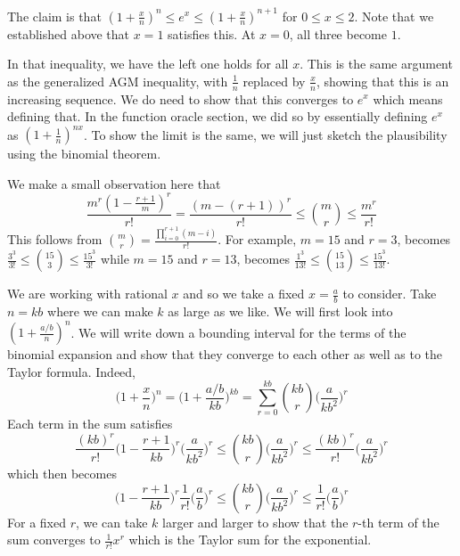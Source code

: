 \documentclass[12pt]{article}
\begin{document}
The claim is that $(1+\frac{x}{n})^n \leq e^x \leq (1+\frac{x}{n})^{n+1}$ for $0 \leq x \leq 2$. Note that we established above that $x=1$ satisfies this. At $x=0$, all three become $1$. 

In that inequality, we have the left one holds for all $x$. This is the same argument as the generalized AGM inequality, with $\frac{1}{n}$ replaced by $\frac{x}{n}$, showing that this is an increasing sequence. We do need to show that this converges to $e^x$ which means defining that. In the function oracle section, we did so by essentially defining $e^x$ as $(1+\frac{1}{n})^{nx}$. To show the limit is the same, we will just sketch the plausibility using the binomial theorem. 

We make a small observation here that $$\frac{m^r(1 - \frac{r+1}{m})^r}{r!} = \frac{(m - (r+1))^r}{r!} \leq \binom{m}{r} \leq \frac{m^r}{r!}$$ This follows from $\binom{m}{r} = \frac{\prod_{i=0}^{r+1} (m-i)}{r!}$. For example, $m=15$ and $r=3$, becomes $\frac{3^3}{3!} \leq \binom{15}{3} \leq \frac{15^3}{3!}$ while $m=15$ and $r=13$, becomes $\frac{1^3}{13!} \leq \binom{15}{13} \leq \frac{15^3}{13!}$. 

We are working with rational $x$ and so we take a fixed $x=\frac{a}{b}$ to consider. Take $n = kb$ where we can make $k$ as large as we like. We will first look into $(1+ \frac{a/b}{n})^n$. We will write down a bounding interval for the terms of the binomial expansion and show that they converge to each other as well as to the Taylor formula. Indeed, 
$$\bigg(1+\frac{x}{n}\bigg)^n = \bigg(1+ \frac{a/b}{kb}\bigg)^{kb} = \sum_{r=0}^{kb} \binom{kb}{r} \bigg(\frac{a}{kb^2}\bigg)^r$$
Each term in the sum satisfies 
$$\frac{(kb)^r}{r!} \bigg( 1 - \frac{r+1}{kb}\bigg)^r \bigg(\frac{a}{kb^2}\bigg)^r \leq \binom{kb}{r} \bigg(\frac{a}{kb^2}\bigg)^r \leq \frac{(kb)^r}{r!} \bigg(\frac{a}{kb^2}\bigg)^r$$ 
which then becomes
$$\bigg( 1 - \frac{r+1}{kb}\bigg)^r \frac{1}{r!} \bigg(\frac{a}{b}\bigg)^r \leq \binom{kb}{r} \bigg(\frac{a}{kb^2}\bigg)^r \leq \frac{1}{r!}\bigg(\frac{a}{b}\bigg)^r$$ 
For a fixed $r$, we can take $k$ larger and larger to show that the $r$-th term of the sum converges to $\frac{1}{r!}x^r$ which is the Taylor sum for the exponential. 
\end{document}
